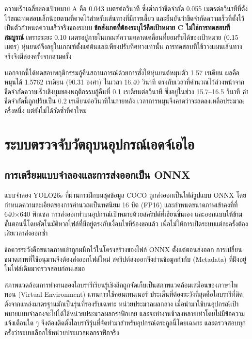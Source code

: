 \documentclass[a4paper,12pt]{report}
\begin{document}
ความเร็วเฉลี่ยของเป้าหมาย A คือ 0.043 เมตรต่อวินาที
ซึ่งต่ำกว่าขีดจำกัด 0.055 เมตรต่อวินาทีที่ตั้งไว้ขณะทดสอบเล็กน้อยตามที่คาดไว้สำหรับเส้นทางที่มีการเลี้ยว
และยืนยันว่าขีดจำกัดความเร็วที่ตั้งไว้เป็นตัวกำหนดความเร็วจริงของระบบ
\textbf{ข้อสังเกตที่ต้องระบุไว้คือเป้าหมาย C ไม่ใช่การทดสอบที่สมบูรณ์}
เพราะระยะ 0.10 เมตรอยู่ภายในเกณฑ์ความคลาดเคลื่อนที่ยอมรับได้ของเป้าหมาย (0.15 เมตร)
หุ่นยนต์จึงอยู่ในเกณฑ์ตั้งแต่ต้นและเพียงปรับทิศทางเท่านั้น
การทดสอบที่ใช้วางแผนเส้นทางจริงจึงมีสองครั้งจากสามครั้ง

นอกจากนี้ได้ทดสอบพฤติกรรมกู้คืนสถานการณ์ด้วยการสั่งให้หุ่นยนต์หมุนตัว 1.57 เรเดียน
ผลคือหมุนได้ 1.5762 เรเดียน (90.31 องศา) ในเวลา 16.40 วินาที
ตรงกับเวลาที่คำนวณไว้ล่วงหน้าจากขีดจำกัดความเร็วเชิงมุมของพฤติกรรมกู้คืนที่
0.1 เรเดียนต่อวินาที ซึ่งอยู่ในช่วง 15.7--16.5 วินาที
ค่าขีดจำกัดนี้ถูกปรับเป็น 0.2 เรเดียนต่อวินาทีในภายหลัง
เวลาการหมุนจึงคาดว่าจะลดลงเหลือประมาณครึ่งหนึ่ง แต่ยังไม่ได้วัดซ้ำที่ค่าใหม่


\section{ระบบตรวจจับวัตถุบนอุปกรณ์เอดจ์เอไอ}

\subsection{การเตรียมแบบจำลองและการส่งออกเป็น ONNX}

แบบจำลอง YOLO26s ที่ผ่านการฝึกบนชุดข้อมูล COCO ถูกส่งออกเป็นไฟล์รูปแบบ ONNX
โดยกำหนดความละเอียดของการคำนวณเป็นทศนิยม 16 บิต (FP16)
และกำหนดขนาดภาพเข้าคงที่ที่ 640$\times$640 พิกเซล
การส่งออกทำบนอุปกรณ์เป้าหมายด้วยสคริปต์ที่เขียนขึ้นเอง
และออกแบบให้ข้ามขั้นตอนนี้โดยอัตโนมัติหากไฟล์ที่มีอยู่ตรงกับเงื่อนไขที่ร้องขอแล้ว
เพื่อไม่ให้การเปิดระบบแต่ละครั้งต้องเสียเวลาส่งออกซ้ำ

ข้อควรระวังคือขนาดภาพเข้าถูกผนึกไว้ในโครงสร้างของไฟล์ ONNX ตั้งแต่ตอนส่งออก
การเปลี่ยนขนาดภาพที่ใช้อนุมานจึงต้องส่งออกไฟล์ใหม่
สคริปต์ส่งออกจึงอ่านข้อมูลกำกับ (Metadata) ที่ฝังอยู่ในไฟล์เดิมมาตรวจสอบก่อนเสมอ

สภาพแวดล้อมการทำงานของไลบรารีเรียนรู้เชิงลึกถูกจัดเก็บเป็นสภาพแวดล้อมเสมือนของภาษาไพทอน
(Virtual Environment) แทนการใช้คอนเทนเนอร์
ประเด็นที่ต้องระวังที่สุดคือไลบรารีที่ติดตั้งจากแหล่งมาตรฐานมักเป็นรุ่นที่รองรับเฉพาะ
หน่วยประมวลผลกลาง
เมื่อนำมาใช้บนอุปกรณ์เป้าหมายแบบจำลองจะไม่ได้ใช้หน่วยประมวลผลกราฟิกเลย
และจะทำงานช้าลงหลายเท่าโดยไม่มีข้อความแจ้งเตือนใด ๆ
จึงต้องติดตั้งไลบรารีรุ่นที่จัดทำมาสำหรับอุปกรณ์ตระกูลนี้โดยเฉพาะ
และตรวจสอบทุกครั้งว่าระบบเลือกใช้หน่วยประมวลผลกราฟิกจริง
\end{document}
